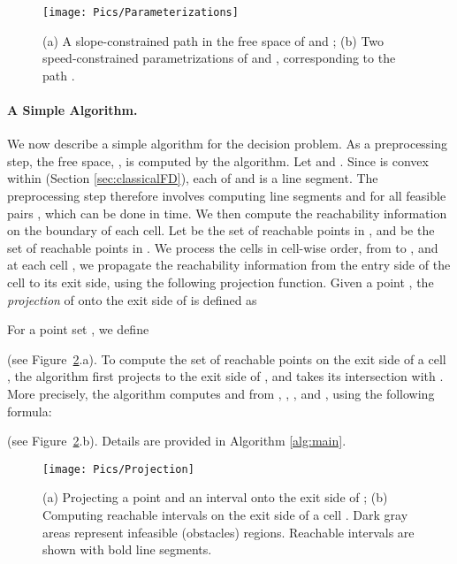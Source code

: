 \documentclass[12pt]{dalthesis}
\newcommand{\SC}{slope-constrained }
\begin{document}
\begin{figure}[t]
	\centering
	\texttt{[image: Pics/Parameterizations]}
	\caption{
	(a) A \SC path  in the free space of  and ;
	(b) Two speed-constrained parametrizations of  and ,
	corresponding to the path .}
	\label{fig:parametrizations}
\end{figure}





\paragraph{A Simple Algorithm.}
We now describe a simple algorithm for the decision problem.
As a preprocessing step, the free space, , is computed by the algorithm.
Let  and .
Since  is convex within (Section \ref{sec:classicalFD}),
each of  and  is a line segment. 
The preprocessing step therefore involves computing line segments
 and  for all feasible pairs , which can be done in  time.
We then compute the reachability information on the boundary of each cell.
Let  be the set of reachable points in ,
and  be the set of reachable points in .
We process the cells in cell-wise order, from  to ,
and at each cell , we propagate the reachability information 
from the entry side of the cell to its exit side, using the following projection function. 
Given a point , the {\em projection} of  onto the exit side of  is defined as

For a point set , we define 

(see Figure~\ref{fig:project}.a).
To compute the set of reachable points on the exit side of a cell ,
the algorithm first projects  to the exit side of ,
and takes its intersection with .
More precisely, the algorithm computes 
  and  from
, , , and , using the following formula:

(see Figure~\ref{fig:project}.b).
Details are provided in Algorithm \ref{alg:main}.


\begin{figure}[t]
	\centering
	\texttt{[image: Pics/Projection]}
	\caption{ (a) Projecting a point  and an interval  onto the exit side of ;
	(b) Computing reachable intervals on the exit side of a cell .
	Dark gray areas represent infeasible (obstacles) regions.
	Reachable intervals are shown with bold line segments.
	}
	\label{fig:project}
\end{figure}
\end{document}
